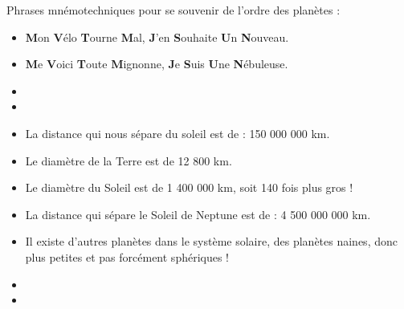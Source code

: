 \documentclass[12pt,a4paper]{article}
\begin{document}
\begin{myrem}
	Phrases mnémotechniques pour se souvenir de l'ordre des planètes :
	\begin{itemize}
		\item \textbf{M}on \textbf{V}élo \textbf{T}ourne \textbf{M}al, \textbf{J}'en \textbf{S}ouhaite \textbf{U}n \textbf{N}ouveau.
		\item \textbf{M}e \textbf{V}oici \textbf{T}oute \textbf{M}ignonne, \textbf{J}e \textbf{S}uis \textbf{U}ne \textbf{N}ébuleuse.
	\end{itemize}

\end{myrem}

\begin{myexos}
	\begin{itemize}
		\item {}
		\item  {} 
	\end{itemize}
\end{myexos}

\begin{itemize}
	\item La distance qui nous sépare du soleil est de : 150 000 000 km.
	\item Le diamètre de la Terre est de 12 800 km.
	\item Le diamètre du Soleil est de 1 400 000 km, soit 140 fois plus gros !
	\item La distance qui sépare le Soleil de Neptune est de : 
	4 500 000 000 km.
	\item Il existe d’autres planètes dans le système solaire, des planètes naines, donc plus petites et pas forcément sphériques !
	
\end{itemize}

\begin{myexos}
\begin{itemize}
	\item {}
	\item  {} 
\end{itemize}
\end{myexos}
\end{document}
